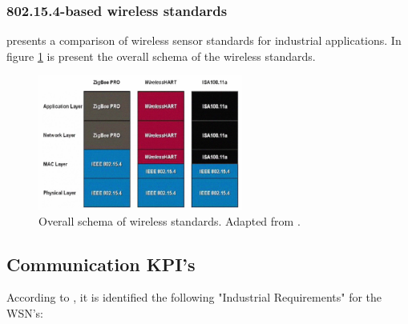 \subsubsection{802.15.4-based wireless standards}

\cite{Radmand2010} presents a comparison of wireless sensor standards for industrial applications. In figure \ref{fig:radmand2010} is present the overall schema of the wireless standards.


\begin{figure}[h!]
	\centering
	\includegraphics[width=0.6\textwidth,keepaspectratio]{figures/radmand2010}
	\caption{Overall schema of wireless standards. Adapted from \cite{Radmand2010}.}
	\label{fig:radmand2010}
\end{figure}


\subsection{Communication KPI’s}

According to \cite{Radmand2010}, it is identified the following "Industrial Requirements" for the WSN's:

